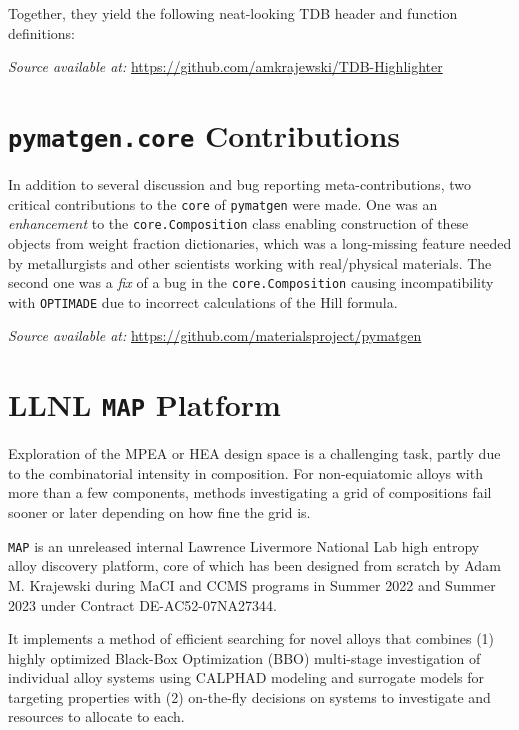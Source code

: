 Together, they yield the following neat-looking TDB header and function definitions:


\hspace{24pt} 
\textit{Source available at:} 
\href{https://github.com/amkrajewski/TDB-Highlighter}{https://github.com/amkrajewski/TDB-Highlighter}



\section{\texttt{pymatgen.core} Contributions} \label{osoft:sec:pymatgen}

In addition to several discussion and bug reporting meta-contributions, two critical contributions to the \texttt{core} of \texttt{pymatgen} were made. One was an \emph{enhancement} to the \texttt{core.Composition} class enabling construction of these objects from weight fraction dictionaries, which was a long-missing feature needed by metallurgists and other scientists working with real/physical materials. The second one was a \emph{fix} of a bug in the \texttt{core.Composition} causing incompatibility with \texttt{OPTIMADE} due to incorrect calculations of the Hill formula.

\hspace{24pt} 
\textit{Source available at:} 
\href{https://github.com/materialsproject/pymatgen}{https://github.com/materialsproject/pymatgen}


\section{LLNL \texttt{MAP} Platform} \label{osoft:sec:map}

Exploration of the MPEA or HEA design space is a challenging task, partly due to the combinatorial intensity in composition. For non-equiatomic alloys with more than a few components, methods investigating a grid of compositions fail sooner or later depending on how fine the grid is.

\texttt{MAP} is an unreleased internal Lawrence Livermore National Lab high entropy alloy discovery platform, core of which has been designed from scratch by Adam M. Krajewski during MaCI and CCMS programs in Summer 2022 and Summer 2023 under Contract DE-AC52-07NA27344.

It implements a method of efficient searching for novel alloys that combines (1) highly optimized Black-Box Optimization (BBO) multi-stage investigation of individual alloy systems using CALPHAD modeling and surrogate models for targeting properties with (2) on-the-fly decisions on systems to investigate and resources to allocate to each. 

